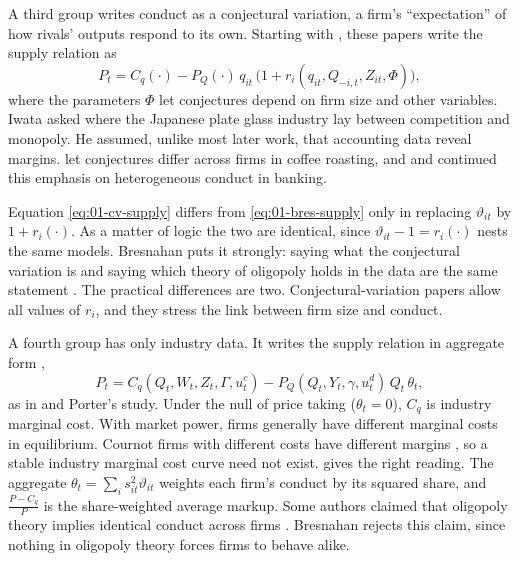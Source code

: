 A third group writes conduct as a conjectural variation, a firm's ``expectation'' of how rivals' outputs respond
to its own. Starting with \citet{Iwata1974}, these papers write the supply relation as
\begin{equation}\label{eq:01-cv-supply}
P_t = C_q(\cdot) - P_Q(\cdot)\, q_{it}\,\bigl(1 + r_i(q_{it}, Q_{-i,t}, Z_{it}, \Phi)\bigr),
\end{equation}
where the parameters $\Phi$ let conjectures depend on firm size and other variables. Iwata asked where the Japanese
plate glass industry lay between competition and monopoly. He assumed, unlike most later work, that accounting data
reveal margins. \citet{GollopRoberts1979} let conjectures differ across firms in coffee roasting, and
\citet{SpillerFavaro1984} and \citet{GelfandSpiller1987} continued this emphasis on heterogeneous conduct in banking.

Equation \eqref{eq:01-cv-supply} differs from \eqref{eq:01-bres-supply} only in replacing $\vartheta_{it}$ by
$1 + r_i(\cdot)$. As a matter of logic the two are identical, since $\vartheta_{it} - 1 = r_i(\cdot)$ nests the same
models. Bresnahan puts it strongly: saying what the conjectural variation is and saying which theory of oligopoly holds
in the data are the same statement \citep[p.~1027]{Bresnahan1989}. The practical differences are two.
Conjectural-variation papers allow all values of $r_i$, and they stress the link between firm size and conduct.

A fourth group has only industry data. It writes the supply relation in aggregate form \citep[eq.~16]{Bresnahan1989},
\begin{equation}\label{eq:01-aggregate-supply}
P_t = C_q(Q_t, W_t, Z_t, \Gamma, u^c_t) - P_Q(Q_t, Y_t, \gamma, u^d_t)\, Q_t\, \theta_t ,
\end{equation}
as in \citet{Appelbaum1979} and Porter's study. Under the null of price taking ($\theta_t = 0$), $C_q$ is industry
marginal cost. With market power, firms generally have different marginal costs in equilibrium. Cournot firms with
different costs have different margins \citep{CowlingWaterson1976}, so a stable industry marginal cost curve need not
exist.  gives the right reading. The aggregate $\theta_t = \sum_i s_{it}^2\vartheta_{it}$
weights each firm's conduct by its squared share, and $\frac{P - C_q}{P}$ is the share-weighted average markup. Some authors claimed that oligopoly theory implies identical
conduct across firms \citep{Appelbaum1982,Lopez1984}. Bresnahan rejects this claim, since nothing in oligopoly theory
forces firms to behave alike.


